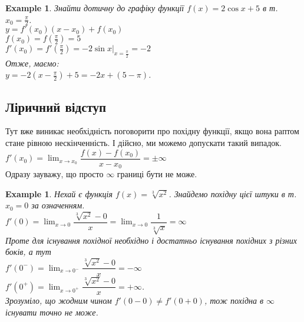 \documentclass[a4paper, 14pt]{article}
\theoremstyle{theoremdd}
\theoremstyle{theoremdd}
\theoremstyle{theoremdd}
\theoremstyle{theoremdd}
\newtheorem{example}[theorem]{Example}
\theoremstyle{theoremdd}
\theoremstyle{theoremdd}
\theoremstyle{theoremdd}
\theoremstyle{theoremdd}
\begin{document}
\begin{example}
Знайти дотичну до графіку функції $f(x) = 2 \cos x + 5$ в т. $x_0 = \displaystyle \frac{\pi}{2}$.\\
$y = f'(x_0)(x-x_0)+f(x_0)$\\
$f(x_0) = \displaystyle f(\frac{\pi}{2}) = 5$\\
$f'(x_0) = \displaystyle f'(\frac{\pi}{2}) = -2 \sin x |_{x = \frac{\pi}{2}} = -2$\\
Отже, маємо:\\
$y = \displaystyle -2(x-\frac{\pi}{2}) + 5 = -2x + (5 - \pi)$.
\end{example}

\subsection*{Ліричний відступ}
Тут вже виникає необхідність поговорити про похідну функції, якщо вона раптом стане рівною нескінченність. І дійсно, ми можемо допускати такий випадок.\\
$f'(x_0) = \displaystyle \lim_{x \to x_0} \dfrac{f(x)-f(x_0)}{x-x_0} = \pm \infty$\\
Одразу зауважу, що просто $\infty$ границі бути не може.

\begin{example}
Нехай є функція $f(x) = \sqrt[3]{x^2}$. Знайдемо похідну цієї штуки в т. $x_0 = 0$ за означенням.\\
$f'(0) = \displaystyle \lim_{x \to 0} \dfrac{\sqrt[3]{x^2} - 0}{x} = \lim_{x \to 0} \dfrac{1}{\sqrt[3]{x}} = \infty$\\
Проте для існування похідної необхідно і достатньо існування похідних з різних боків, а тут\\
$f'(0^-) = \displaystyle \lim_{x \to 0^-} \dfrac{\sqrt[3]{x^2} - 0}{x} = -\infty$\\
$f'(0^+) = \displaystyle \lim_{x \to 0^+} \dfrac{\sqrt[3]{x^2} - 0}{x} = +\infty$.\\
Зрозуміло, що жодним чином $f'(0-0) \neq f'(0+0)$, тож похідна в $\infty$ існувати точно не може.
\begin{figure}[H]
\centering
{
}
\end{figure}
\end{example}
\end{document}
